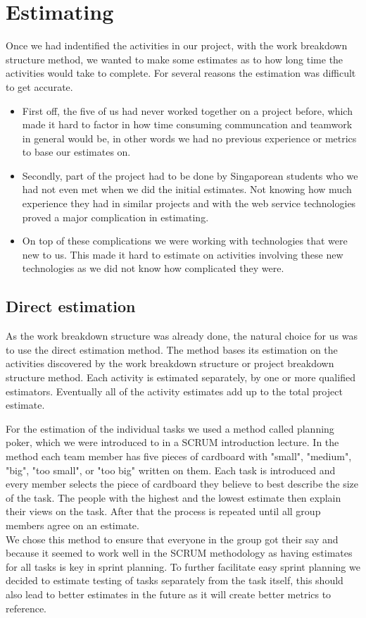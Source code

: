 \section{Estimating}
Once we had indentified the activities in our project, with the work breakdown structure method, we wanted to make some estimates as to how long time the activities would take to complete. For several reasons the estimation was difficult to get accurate.
\begin{itemize}
\item First off, the five of us had never worked together on a project before, which made it hard to factor in how time consuming communcation and teamwork in general would be, in other words we had no previous experience or metrics to base our estimates on. 

\item Secondly, part of the project had to be done by Singaporean students who we had not even met when we did the initial estimates. Not knowing how much experience they had in similar projects and with the web service technologies proved a major complication in estimating.

\item  On top of these complications we were working with technologies that were new to us. This made it hard to estimate on activities involving these new technologies as we did not know how complicated they were.

\end{itemize}
\subsection{Direct estimation}
As the work breakdown structure was already done, the natural choice for us was to use the direct estimation method\cite{caye}. The method bases its estimation on the activities discovered by the work breakdown structure or project breakdown structure method. Each activity is  estimated separately, by one or more qualified estimators. Eventually all of the activity estimates add up to the total project estimate. 

For the estimation of the individual tasks we used a method called planning poker, which we were introduced to in a SCRUM introduction lecture. In the method each team member has five pieces of cardboard with "small", "medium", "big", "too small", or "too big" written on them. Each task is introduced and every member selects the piece of cardboard they believe to best describe the size of the task. The people with the highest and the lowest estimate then explain their views on the task. After that the process is repeated until all group members agree on an estimate. \\
We chose this method to ensure that everyone in the group got their say and because it seemed to work well in the SCRUM methodology as having estimates for all tasks is key in sprint planning. To further facilitate easy sprint planning we decided to estimate testing of tasks separately from the task itself, this should also lead to better estimates in the future as it will create better metrics to reference.

